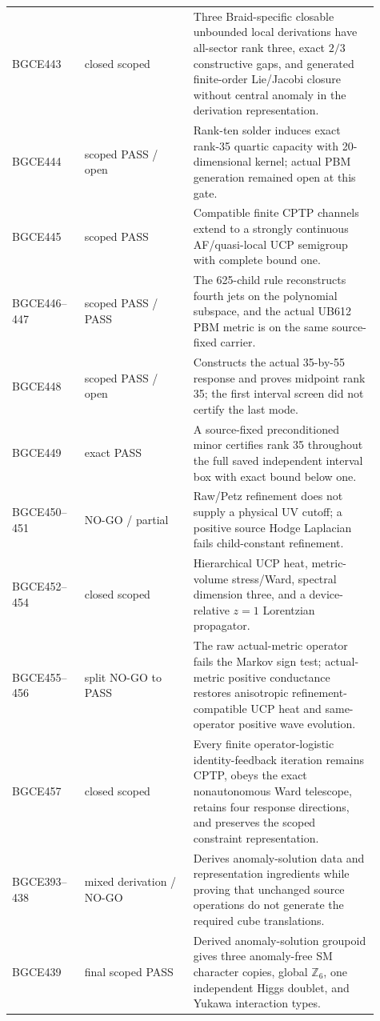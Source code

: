 \documentclass[11pt]{article}
\theoremstyle{definition}
\theoremstyle{remark}
\begin{document}
\begin{longtable}{>{\raggedright\arraybackslash}p{0.18\linewidth} >{\raggedright\arraybackslash}p{0.27\linewidth} >{\raggedright\arraybackslash}p{0.46\linewidth}}
BGCE443 & closed scoped & Three Braid-specific closable unbounded local derivations have all-sector rank three, exact $2/3$ constructive gaps, and generated finite-order Lie/Jacobi closure without central anomaly in the derivation representation. \\
BGCE444 & scoped PASS / open & Rank-ten solder induces exact rank-35 quartic capacity with 20-dimensional kernel; actual PBM generation remained open at this gate. \\
BGCE445 & scoped PASS & Compatible finite CPTP channels extend to a strongly continuous AF/quasi-local UCP semigroup with complete bound one. \\
BGCE446--447 & scoped PASS / PASS & The 625-child rule reconstructs fourth jets on the polynomial subspace, and the actual UB612 PBM metric is on the same source-fixed carrier. \\
BGCE448 & scoped PASS / open & Constructs the actual 35-by-55 response and proves midpoint rank 35; the first interval screen did not certify the last mode. \\
BGCE449 & exact PASS & A source-fixed preconditioned minor certifies rank 35 throughout the full saved independent interval box with exact bound below one. \\
BGCE450--451 & NO-GO / partial & Raw/Petz refinement does not supply a physical UV cutoff; a positive source Hodge Laplacian fails child-constant refinement. \\
BGCE452--454 & closed scoped & Hierarchical UCP heat, metric-volume stress/Ward, spectral dimension three, and a device-relative $z=1$ Lorentzian propagator. \\
BGCE455--456 & split NO-GO to PASS & The raw actual-metric operator fails the Markov sign test; actual-metric positive conductance restores anisotropic refinement-compatible UCP heat and same-operator positive wave evolution. \\
BGCE457 & closed scoped & Every finite operator-logistic identity-feedback iteration remains CPTP, obeys the exact nonautonomous Ward telescope, retains four response directions, and preserves the scoped constraint representation. \\
BGCE393--438 & mixed derivation / NO-GO & Derives anomaly-solution data and representation ingredients while proving that unchanged source operations do not generate the required cube translations. \\
BGCE439 & final scoped PASS & Derived anomaly-solution groupoid gives three anomaly-free SM character copies, global $\mathbb Z_6$, one independent Higgs doublet, and Yukawa interaction types. \\

\end{longtable}
\end{document}
